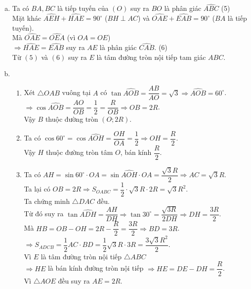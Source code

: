 \begin{bt}
{\begin{enumerate}[a)]
			\item Ta có $BA, BC$ là tiếp tuyến của $(O)$ suy ra $BO$ là phân giác $\widehat{ABC}$ \hfill (5)\\
			Mặt khác $\widehat{AEH} + \widehat{HAE} = 90^\circ$ ($BH\perp AC$) và 
			$\widehat{OAE}+\widehat{EAB} = 90^\circ$ ($BA$ là tiếp tuyến).\\
			Mà $\widehat{OAE} = \widehat{OEA}$ (vì $OA = OE$)\\
			$\Rightarrow \widehat{HAE} = \widehat{EAB}$ suy ra $AE$ là phân giác $\widehat{CAB}$. \hfill (6) \\
			Từ $(5)$ và $(6)$ suy ra $E$ là tâm đường tròn nội tiếp tam giác $ABC$.
			\item \hfill
			\begin{enumerate}[1)]
				\item Xét $\triangle OAB$ vuông tại $A$ có $\tan\widehat{AOB} = \dfrac{AB}{AO} = \sqrt{3}\Rightarrow \widehat{AOB} = 60^\circ$.\\
				$\Rightarrow \cos\widehat{AOB} = \dfrac{AO}{OB}=\dfrac{1}{2} = \dfrac{R}{OB} \Rightarrow OB = 2R$.\\
				Vậy $B$ thuộc đường tròn $(O;2R)$.
				\item Ta có $\cos 60^\circ = \cos\widehat{AOH} = \dfrac{OH}{OA} =\dfrac{1}{2}\Rightarrow OH = \dfrac{R}{2}$.\\
				Vậy $H$ thuộc đường tròn tâm $O$, bán kính $\dfrac{R}{2}$.
				\item Ta có $AH = \sin 60^\circ\cdot OA = \sin \widehat{AOH}\cdot OA = \dfrac{\sqrt{3}R}{2}\Rightarrow AC = \sqrt{3}R$.\\
				Ta lại có $OB = 2R\Rightarrow S_{OABC} = \dfrac{1}{2}\cdot\sqrt{3}R\cdot 2R = \sqrt{3}R^2$.\\
				Ta chứng minh $\triangle DAC$ đều. \\
				Từ đó suy ra $\tan \widehat{ADH} = \dfrac{AH}{DH}\Rightarrow \tan 30^\circ = \dfrac{\sqrt{3R}}{2DH}\Rightarrow DH = \dfrac{3R}{2}$.\\
				Mà $HB = OB - OH = 2R-\dfrac{R}{2} = \dfrac{3R}{2}\Rightarrow BD = 3R$.\\
				$\Rightarrow S_{ADCB} = \dfrac{1}{2}AC\cdot BD=\dfrac{1}{2}\sqrt{3}R\cdot 3R = \dfrac{3\sqrt{3}R^2}{2}$.\\
				Vì $E$ là tâm đường tròn nội tiếp $\triangle ABC$\\
				$\Rightarrow HE$ là bán kính đường tròn nội tiếp $\Rightarrow HE = DE - DH = \dfrac{R}{2}$.\\
				Vì $\triangle AOE$ đều suy ra $AE = 2R$.
			\end{enumerate}
		\end{enumerate}
	}
\end{bt}

